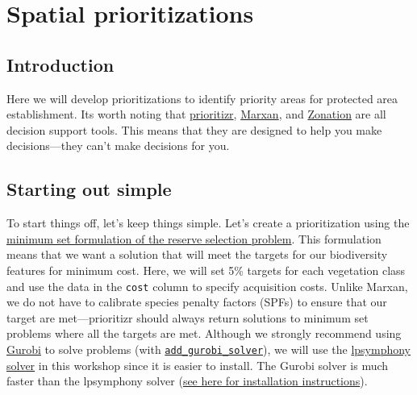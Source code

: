 \documentclass[12pt,]{book}
\begin{document}
\hypertarget{spatial-prioritizations}{%
\chapter{Spatial prioritizations}\label{spatial-prioritizations}}

\hypertarget{introduction-2}{%
\section{Introduction}\label{introduction-2}}

Here we will develop prioritizations to identify priority areas for protected area establishment. Its worth noting that \href{https://prioritizr.net/}{prioritizr}, \href{http://marxan.org/}{Marxan}, and \href{https://www.helsinki.fi/en/researchgroups/digital-geography-lab/software-developed-in-cbig\#section-52992}{Zonation} are all decision support tools. This means that they are designed to help you make decisions---they can't make decisions for you.

\hypertarget{starting-out-simple}{%
\section{Starting out simple}\label{starting-out-simple}}

To start things off, let's keep things simple. Let's create a prioritization using the \href{https://prioritizr.net/reference/add_min_set_objective.html}{minimum set formulation of the reserve selection problem}. This formulation means that we want a solution that will meet the targets for our biodiversity features for minimum cost. Here, we will set 5\% targets for each vegetation class and use the data in the \texttt{cost} column to specify acquisition costs. Unlike Marxan, we do not have to calibrate species penalty factors (SPFs) to ensure that our target are met---prioritizr should always return solutions to minimum set problems where all the targets are met. Although we strongly recommend using \href{https://www.gurobi.com/}{Gurobi} to solve problems (with \href{https://prioritizr.net/reference/add_gurobi_solver.html}{\texttt{add\_gurobi\_solver}}), we will use the \href{https://prioritizr.net/reference/add_lsymphony_solver.html}{lpsymphony solver} in this workshop since it is easier to install. The Gurobi solver is much faster than the lpsymphony solver (\href{https://prioritizr.net/articles/gurobi_installation.html}{see here for installation instructions}).
\end{document}
